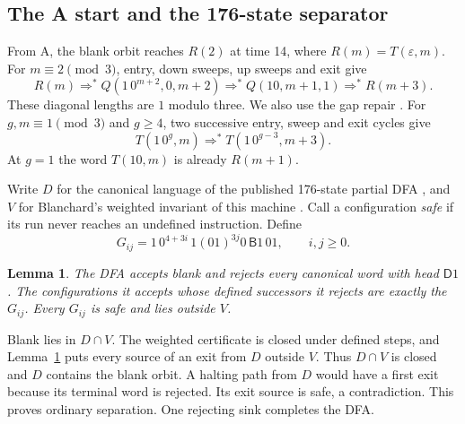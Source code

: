 \documentclass[11pt]{article}
\newtheorem{lemma}[theorem]{Lemma}
\newcommand{\state}[1]{\mathsf{#1}}
\newcommand{\run}{\mathrel{\Rightarrow^{*}}}
\newcommand{\eps}{\varepsilon}
\begin{document}
\subsection{The A start and the 176-state separator}\label{positive}

From A, the blank orbit reaches \(R(2)\) at time 14, where \(R(m)=T(\eps,m)\). For \(m\equiv2\pmod3\), entry, down sweeps, up sweeps and exit give
\[
 R(m)\run Q(1\,0^{m+2},0,m+2)\run Q(10,m+1,1)\run R(m+3).
\]
These diagonal lengths are \(1\) modulo three. We also use the gap repair \cite[Lemma~3]{prior}. For \(g,m\equiv1\pmod3\) and \(g\ge4\), two successive entry, sweep and exit cycles give
\begin{equation}\label{repair}
 T(1\,0^g,m)\run T(1\,0^{g-3},m+3).
\end{equation}
At \(g=1\) the word \(T(10,m)\) is already \(R(m+1)\).

Write \(D\) for the canonical language of the published 176-state partial DFA \cite{dfa}, and \(V\) for Blanchard's weighted invariant of this machine \cite{weights}. Call a configuration \emph{safe} if its run never reaches an undefined instruction. Define
\begin{equation}\label{gap}
 G_{ij}=1\,0^{4+3i}\,1(01)^{3j}0\,\state B1\,01,\qquad i,j\ge0 .
\end{equation}

\begin{lemma}\label{exit}
The DFA accepts blank and rejects every canonical word with head \(\state D1\). The configurations it accepts whose defined successors it rejects are exactly the \(G_{ij}\). Every \(G_{ij}\) is safe and lies outside \(V\).
\end{lemma}

Blank lies in \(D\cap V\). The weighted certificate is closed under defined steps, and Lemma~\ref{exit} puts every source of an exit from \(D\) outside \(V\). Thus \(D\cap V\) is closed and \(D\) contains the blank orbit. A halting path from \(D\) would have a first exit because its terminal word is rejected. Its exit source is safe, a contradiction. This proves ordinary separation. One rejecting sink completes the DFA.
\end{document}
